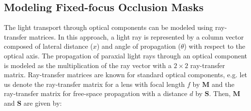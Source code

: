 \subsection{Modeling Fixed-focus Occlusion Masks}
\label{sec:optical_design_fixed_focus}





The light transport through optical components can be modeled using ray-transfer matrices. In this approach, a light ray is represented by a column vector composed of lateral distance ($x$) and angle of propagation ($\theta$) with respect to the optical axis. 
The propagation of paraxial light rays through an optical component is modeled as the multiplication of the ray vector with a $2 \times 2$ ray-transfer matrix. Ray-transfer matrices are known for standard optical components, e.g. let us denote the ray-transfer matrix for a lens with focal length $f$ by $\mathbf{M}$ and the ray-transfer matrix for free-space propagation with a distance $d$ by $\mathbf{S}$. Then, $\mathbf{M}$ and $\mathbf{S}$ are given by:

